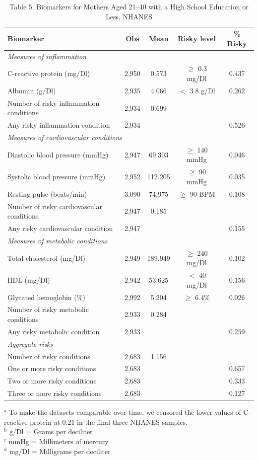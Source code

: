 \begin{table}[htbp]
\centering
\caption{Table 5: Biomarkers for Mothers Aged 21--40 with a High School Education or Less, NHANES}
\begin{tabular}{lcccc}
\toprule
Biomarker & Obs & Mean & Risky level & \% Risky \\
\midrule
\multicolumn{5}{l}{\textit{Measures of inflammation}} \\
\addlinespace
C-reactive protein (mg/Dl) & 2,950 & 0.573 & $\geq$ 0.3 mg/Dl & 0.437 \\
Albumin (g/Dl) & 2,935 & 4.066 & $<$ 3.8 g/Dl & 0.262 \\
Number of risky inflammation conditions & 2,934 & 0.699 & & \\
Any risky inflammation condition & 2,934 & & & 0.526 \\
\midrule
\multicolumn{5}{l}{\textit{Measures of cardiovascular conditions}} \\
\addlinespace
Diastolic blood pressure (mmHg) & 2,947 & 69.303 & $\geq$ 140 mmHg & 0.046 \\
Systolic blood pressure (mmHg) & 2,952 & 112.205 & $\geq$ 90 mmHg & 0.035 \\
Resting pulse (beats/min) & 3,090 & 74.975 & $\geq$ 90 BPM & 0.108 \\
Number of risky cardiovascular conditions & 2,947 & 0.185 & & \\
Any risky cardiovascular condition & 2,947 & & & 0.155 \\
\midrule
\multicolumn{5}{l}{\textit{Measures of metabolic conditions}} \\
\addlinespace
Total cholesterol (mg/Dl) & 2,949 & 189.949 & $\geq$ 240 mg/Dl & 0.102 \\
HDL (mg/Dl) & 2,942 & 53.625 & $<$ 40 mg/Dl & 0.156 \\
Glycated hemoglobin (\%) & 2,992 & 5.204 & $\geq$ 6.4\% & 0.026 \\
Number of risky metabolic conditions & 2,933 & 0.284 & & \\
Any risky metabolic condition & 2,933 & & & 0.259 \\
\midrule
\multicolumn{5}{l}{\textit{Aggregate risks}} \\
\addlinespace
Number of risky conditions & 2,683 & 1.156 & & \\
One or more risky conditions & 2,683 & & & 0.657 \\
Two or more risky conditions & 2,683 & & & 0.333 \\
Three or more risky conditions & 2,683 & & & 0.127 \\
\bottomrule
\end{tabular}
\begin{minipage}{\linewidth}
\smallskip\footnotesize
$^\text{a}$ To make the datasets comparable over time, we censored the lower values of C-reactive protein at 0.21 in the final three NHANES samples. \\
$^\text{b}$ g/Dl = Grams per deciliter \\
$^\text{c}$ mmHg = Millimeters of mercury \\
$^\text{d}$ mg/Dl = Milligrams per deciliter \\
\end{minipage}
\end{table}

